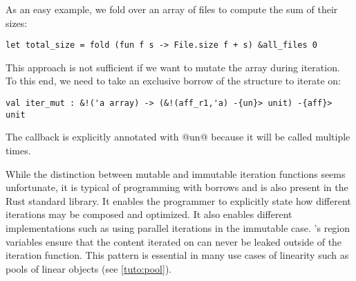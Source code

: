 As an easy example, we fold over an array of files to compute the sum of their sizes:
\begin{lstlisting}
let total_size = fold (fun f s -> File.size f + s) &all_files 0
\end{lstlisting}

This approach is not sufficient if we want to mutate the array during iteration.
To this end, we need to take an exclusive borrow of the structure to iterate
on:
\begin{lstlisting}
val iter_mut : &!('a array) -> (&!(aff_r1,'a) -{un}> unit) -{aff}> unit
\end{lstlisting}

The callback is explicitly annotated with @un@ because  it will be called multiple times.

While the distinction between mutable and immutable iteration functions
seems unfortunate, it is typical of
programming with borrows and is also present in the Rust standard library.
It enables the programmer to explicitly state how different iterations
may be composed and optimized.
It also enables different implementations such as
using parallel iterations in the immutable case.
\lang's region variables ensure that the content iterated on can never
be leaked outside of the iteration function.
This pattern is essential in many use cases of linearity such
as pools of linear objects (see \cref{tuto:pool}).

\lstDeleteShortInline@

